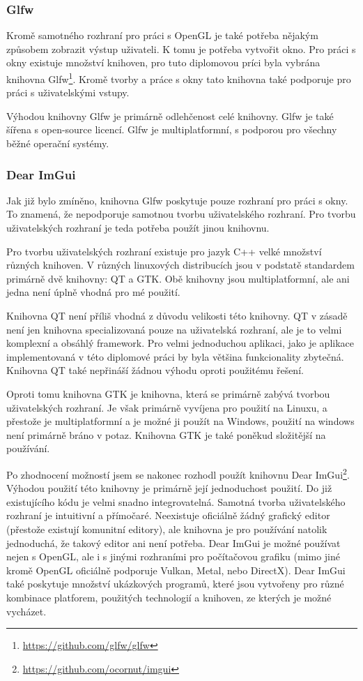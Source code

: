 \documentclass[czech,master]{diploma}
\begin{document}
\subsubsection{Glfw}
Kromě samotného rozhraní pro práci s OpenGL je také potřeba nějakým způsobem zobrazit výstup uživateli. K tomu je potřeba vytvořit okno. Pro práci s okny existuje množství knihoven, pro tuto diplomovou príci byla vybrána knihovna Glfw\footnote{\url{https://github.com/glfw/glfw}}. Kromě tvorby a práce s okny tato knihovna také podporuje pro práci s uživatelskými vstupy. \par
Výhodou knihovny Glfw je primárně odlehčenost celé knihovny. Glfw je také šířena s open-source licencí. Glfw je multiplatformní, s podporou pro všechny běžné operační systémy.

\subsubsection{Dear ImGui}
Jak již bylo zmíněno, knihovna Glfw poskytuje pouze rozhraní pro práci s okny. To znamená, že nepodporuje samotnou tvorbu uživatelského rozhraní. Pro tvorbu uživatelských rozhraní je teda potřeba použít jinou knihovnu. \par
Pro tvorbu uživatelských rozhraní existuje pro jazyk C++ velké množství různých knihoven. V různých linuxových distribucích jsou v podstatě standardem primárně dvě knihovny: QT a GTK\@. Obě knihovny jsou multiplatformní, ale ani jedna není úplně vhodná pro mé použití.\par Knihovna QT není příliš vhodná z důvodu velikosti této knihovny. QT v zásadě není jen knihovna specializovaná pouze na uživatelská rozhraní, ale je to velmi komplexní a obsáhlý framework. Pro velmi jednoduchou aplikaci, jako je aplikace implementovaná v této diplomové práci by byla většina funkcionality zbytečná. Knihovna QT také nepřináší žádnou výhodu oproti použitému řešení.\par
Oproti tomu knihovna GTK je knihovna, která se primárně zabývá tvorbou uživatelských rozhraní. Je však primárně vyvíjena pro použití na Linuxu, a přestože je multiplatformní a je možné ji použít na Windows, použití na windows není primárně bráno v potaz. Knihovna GTK je také poněkud složitější na používání. \par
Po zhodnocení možností jsem se nakonec rozhodl použít knihovnu Dear ImGui\footnote{\url{https://github.com/ocornut/imgui}}. Výhodou použití této knihovny je primárně její jednoduchost použití. Do již existujícího kódu je velmi snadno integrovatelná. Samotná tvorba uživatelského rozhraní je intuitivní a přímočaré. Neexistuje oficiálně žádný grafický editor (přestože existují komunitní editory), ale knihovna je pro používání natolik jednoduchá, že takový editor ani není potřeba. Dear ImGui je možné používat nejen s OpenGL, ale i s jinými rozhraními pro počítačovou grafiku (mimo jiné kromě OpenGL oficiálně podporuje Vulkan, Metal, nebo DirectX). Dear ImGui také poskytuje množství ukázkových programů, které jsou vytvořeny pro různé kombinace platforem, použitých technologií a knihoven, ze kterých je možné vycházet. \par
\end{document}
